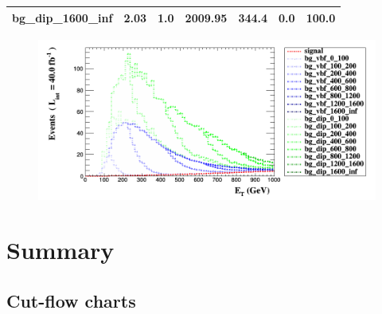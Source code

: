 \documentclass[a4paper, 10pt]{article}
\begin{document}
\begin{table}[H]
\begin{center}
\begin{tabular}{|m{23.0mm}|m{23.0mm}|m{18.0mm}|m{19.0mm}|m{19.0mm}|m{19.0mm}|m{19.0mm}|}
      \hline
      {\cellcolor{white}         bg\_dip\_1600\_inf}& {\cellcolor{white}         2.03}& {\cellcolor{white}         1.0}& {\cellcolor{white}         2009.95}& {\cellcolor{white}         344.4}& {\cellcolor{red}         0.0}& {\cellcolor{red}         100.0}\\
\hline
    \end{tabular}
  \end{center}
\end{table}

\begin{figure}[H]
  \begin{center}
    \includegraphics[scale=0.45]{selection_15.png}\\
\caption{   }
  \end{center}
\end{figure}
\newpage
\section{ Summary}

\subsection{Cut-flow charts}
\end{document}
